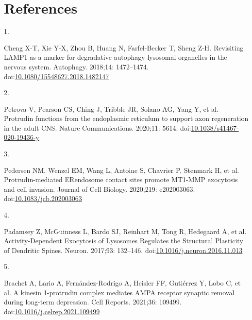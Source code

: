 \documentclass[
  12pt,
  a4paper,
]{book}
\newlength{\cslhangindent}
\newlength{\csllabelwidth}
\newlength{\cslentryspacingunit} %
\newenvironment{CSLReferences}[2] %
 {%
  \setlength{\parindent}{0pt}
  \ifodd #1
  \let\oldpar\par
  \def\par{\hangindent=\cslhangindent\oldpar}
  \fi
  \setlength{\parskip}{#2\cslentryspacingunit}
 }%
 {}
\newcommand{\CSLLeftMargin}[1]{\parbox[t]{\csllabelwidth}{#1}}
\newcommand{\CSLRightInline}[1]{\parbox[t]{\linewidth - \csllabelwidth}{#1}\break}
\begin{document}
\hypertarget{BIB}{%
\chapter*{References}\label{BIB}}


\hypertarget{refs}{}
\begin{CSLReferences}{0}{0}
\leavevmode{}%
\CSLLeftMargin{1. }%
\CSLRightInline{Cheng X-T, Xie Y-X, Zhou B, Huang N, Farfel-Becker T, Sheng Z-H. Revisiting {LAMP1} as a marker for degradative autophagy-lysosomal organelles in the nervous system. Autophagy. 2018;14: 1472--1474. doi:\href{https://doi.org/10.1080/15548627.2018.1482147}{10.1080/15548627.2018.1482147}}

\leavevmode{}%
\CSLLeftMargin{2. }%
\CSLRightInline{Petrova V, Pearson CS, Ching J, Tribble JR, Solano AG, Yang Y, et al. Protrudin functions from the endoplasmic reticulum to support axon regeneration in the adult {CNS}. Nature Communications. 2020;11: 5614. doi:\href{https://doi.org/10.1038/s41467-020-19436-y}{10.1038/s41467-020-19436-y}}

\leavevmode{}%
\CSLLeftMargin{3. }%
\CSLRightInline{Pedersen NM, Wenzel EM, Wang L, Antoine S, Chavrier P, Stenmark H, et al. Protrudin-mediated {ER}\textendash endosome contact sites promote {MT1-MMP} exocytosis and cell invasion. Journal of Cell Biology. 2020;219: e202003063. doi:\href{https://doi.org/10.1083/jcb.202003063}{10.1083/jcb.202003063}}

\leavevmode{}%
\CSLLeftMargin{4. }%
\CSLRightInline{Padamsey Z, McGuinness L, Bardo SJ, Reinhart M, Tong R, Hedegaard A, et al. Activity-{Dependent Exocytosis} of {Lysosomes Regulates} the {Structural Plasticity} of {Dendritic Spines}. Neuron. 2017;93: 132--146. doi:\href{https://doi.org/10.1016/j.neuron.2016.11.013}{10.1016/j.neuron.2016.11.013}}

\leavevmode{}%
\CSLLeftMargin{5. }%
\CSLRightInline{Brachet A, Lario A, Fernández-Rodrigo A, Heisler FF, Gutiérrez Y, Lobo C, et al. A kinesin 1-protrudin complex mediates {AMPA} receptor synaptic removal during long-term depression. Cell Reports. 2021;36: 109499. doi:\href{https://doi.org/10.1016/j.celrep.2021.109499}{10.1016/j.celrep.2021.109499}}


\end{CSLReferences}
\end{document}
